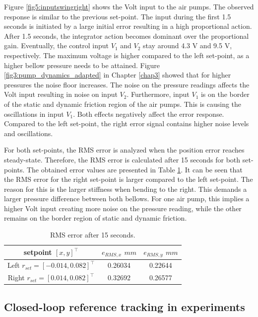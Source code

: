 Figure \ref{fig5:inputswingright} shows the Volt input to the air pumps. The observed response is similar to the previous set-point. The input during the first 1.5 seconds is initiated by a large initial error resulting in a high proportional action. After 1.5 seconds, the integrator action becomes dominant over the proportional gain. Eventually, the control input $V_1$ and $V_2$ stay around 4.3 V and 9.5 V, respectively. The maximum voltage is higher compared to the left set-point, as a higher bellow pressure needs to be attained. Figure \ref{fig3:pump_dynamics_adapted} in Chapter \ref{chap3} showed that for higher pressures the noise floor increases. The noise on the pressure readings affects the Volt input resulting in noise on input $V_2$. Furthermore, input $V_1$ is on the border of the static and dynamic friction region of the air pumps. This is causing the oscillations in input $V_1$. Both effects negatively affect the error response. Compared to the left set-point, the right error signal contains higher noise levels and oscillations. 




For both set-points, the RMS error is analyzed when the position error reaches steady-state. Therefore, the RMS error is calculated after 15 seconds for both set-points. The obtained error values are presented in Table \ref{tab:RMSerrors}. It can be seen that the RMS error for the right set-point is larger compared to the left set-point. The reason for this is the larger stiffness when bending to the right. This demands a larger pressure difference between both bellows. For one air pump, this implies a higher Volt input creating more noise on the pressure reading, while the other remains on the border region of static and dynamic friction.


\begin{table}[H]
    \centering
    \caption{RMS error after 15 seconds.}
    \begin{tabular}{|c|c|c|} \hline
     setpoint $[x,y]^\top$    & $e_{RMS,x}$ $mm$  &  $e_{RMS,y}$ $mm$  \\ \hline
    Left $r_{set}= [-0.014,0.082]^\top$     & 0.26034  & 0.22644 \\ \hline
    Right $r_{set}= [0.014,0.082]^\top$  &  0.32692&   0.26577\\ \hline
    \end{tabular}
    \label{tab:RMSerrors}
\end{table}



\subsection*{Closed-loop reference tracking in experiments}

